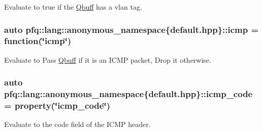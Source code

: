 Evaluate to {\ttfamily true} if the \hyperlink{structpfq_1_1lang_1_1Qbuff}{Qbuff} has a vlan tag. 

\subsubsection[{\texorpdfstring{icmp}{icmp}}]{\setlength{\rightskip}{0pt plus 5cm}auto pfq\+::lang\+::anonymous\+\_\+namespace\{default.\+hpp\}\+::icmp = {\bf function}(\char`\"{}icmp\char`\"{})}\hypertarget{namespacepfq_1_1lang_1_1anonymous__namespace_02default_8hpp_03_a3becf93771a800904f002e39b1cc388f}{}\label{namespacepfq_1_1lang_1_1anonymous__namespace_02default_8hpp_03_a3becf93771a800904f002e39b1cc388f}


Evaluate to {\ttfamily Pass} \hyperlink{structpfq_1_1lang_1_1Qbuff}{Qbuff} if it is an I\+C\+MP packet, {\ttfamily Drop} it otherwise. 

\subsubsection[{\texorpdfstring{icmp\+\_\+code}{icmp_code}}]{\setlength{\rightskip}{0pt plus 5cm}auto pfq\+::lang\+::anonymous\+\_\+namespace\{default.\+hpp\}\+::icmp\+\_\+code = {\bf property}(\char`\"{}icmp\+\_\+code\char`\"{})}\hypertarget{namespacepfq_1_1lang_1_1anonymous__namespace_02default_8hpp_03_a026262dd85de1db88a8303ed0f3dac18}{}\label{namespacepfq_1_1lang_1_1anonymous__namespace_02default_8hpp_03_a026262dd85de1db88a8303ed0f3dac18}


Evaluate to the {\ttfamily code} field of the I\+C\+MP header. 

